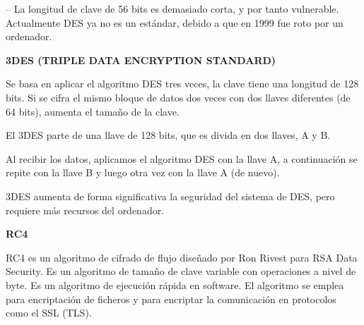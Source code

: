 \documentclass[12pt]{article}
\begin{document}
\begin{justify}
– La longitud de clave de 56 bits es demasiado corta, y por tanto vulnerable. Actualmente DES ya no es un estándar, debido a que en 1999 fue roto por un ordenador.
\end{justify}\par


\vspace{\baselineskip}
\begin{justify}
\textbf{3DES (TRIPLE DATA ENCRYPTION STANDARD)}
\end{justify}\par


\vspace{\baselineskip}
\begin{justify}
Se basa en aplicar el algoritmo DES tres veces, la clave tiene una longitud de 128 bits. Si se cifra el mismo bloque de datos dos veces con dos llaves diferentes (de 64 bits), aumenta el tamaño de la clave.
\end{justify}\par


\vspace{\baselineskip}
\begin{justify}
El 3DES parte de una llave de 128 bits, que es divida en dos llaves, A y B.
\end{justify}\par


\vspace{\baselineskip}
\begin{justify}
Al recibir los datos, aplicamos el algoritmo DES con la llave A, a continuación se repite con la llave B y luego otra vez con la llave A (de nuevo).
\end{justify}\par


\vspace{\baselineskip}
\begin{justify}
3DES aumenta de forma significativa la seguridad del sistema de DES, pero requiere más recursos del ordenador.
\end{justify}\par


\vspace{\baselineskip}
\begin{justify}
\textbf{RC4}
\end{justify}\par


\vspace{\baselineskip}
\begin{justify}
RC4 es un algoritmo de cifrado de flujo diseñado por Ron Rivest para RSA Data Security. Es un algoritmo de tamaño de clave variable con operaciones a nivel de byte. Es un algoritmo de ejecución rápida en software. El algoritmo se emplea para encriptación de ficheros y para encriptar la comunicación en protocolos como el SSL (TLS).
\end{justify}\par
\end{document}

